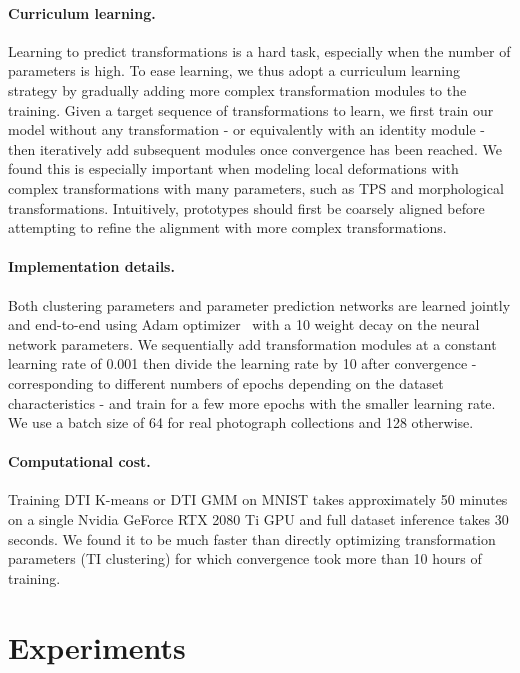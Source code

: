 \documentclass{article}
\begin{document}
\paragraph{Curriculum learning.} Learning to predict transformations is a hard task, 
especially when the number of parameters is high. To ease learning, we thus adopt a 
curriculum learning strategy by gradually adding more complex transformation modules to the 
training.  Given a target sequence of transformations to learn, we first train our model 
without any transformation - or equivalently with an identity module - then iteratively add 
subsequent modules once convergence has been reached. We found this is especially important 
when modeling local deformations with complex transformations with many parameters, such as 
TPS and morphological transformations.  Intuitively, prototypes should first be coarsely 
aligned before attempting to refine the alignment with more complex transformations.

\vspace{-0.7em}
\paragraph{Implementation details.} Both clustering parameters and parameter prediction 
networks are learned jointly and end-to-end using Adam 
optimizer~\cite{kingmaAdamMethodStochastic2015} with a 10 weight decay on the neural 
network parameters. We sequentially add transformation modules at a constant learning rate of 
0.001 then divide the learning rate by 10 after convergence - corresponding to different 
numbers of epochs depending on the dataset characteristics - and train for a few more epochs 
with the smaller learning rate. We use a batch size of 64 for real photograph collections and 
128 otherwise.

\vspace{-0.7em}
\paragraph{Computational cost.} Training DTI K-means or DTI GMM on MNIST takes approximately 
50 minutes on a single Nvidia GeForce RTX 2080 Ti GPU and full dataset inference takes 30 
seconds. We found it to be much faster than directly optimizing transformation parameters (TI 
clustering) for which convergence took more than 10 hours of training.

\section{Experiments}\label{sec:results}
\end{document}
